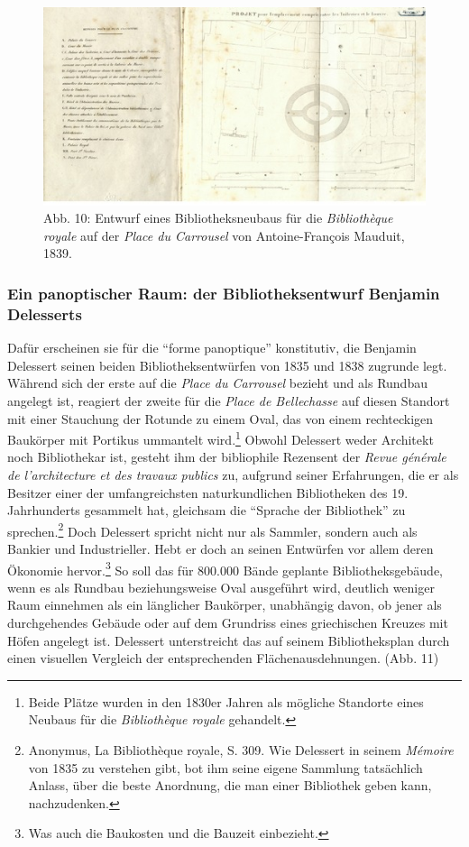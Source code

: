 \begin{figure}[htbp]
\centering
\includegraphics{img/wagner-10.jpg}
\caption{Abb. 10: Entwurf eines Bibliotheksneubaus für die
\emph{Bibliothèque royale} auf der \emph{Place du Carrousel} von
Antoine-François Mauduit, 1839.}
\end{figure}

\subsubsection{Ein panoptischer Raum: der Bibliotheksentwurf Benjamin
Delesserts}\label{ein-panoptischer-raum-der-bibliotheksentwurf-benjamin-delesserts}

Dafür erscheinen sie für die \enquote{forme panoptique} konstitutiv, die
Benjamin Delessert seinen beiden Bibliotheksentwürfen von 1835 und 1838
zugrunde legt. Während sich der erste auf die \emph{Place du Carrousel}
bezieht und als Rundbau angelegt ist, reagiert der zweite für die
\emph{Place de Bellechasse} auf diesen Standort mit einer Stauchung der
Rotunde zu einem Oval, das von einem rechteckigen Baukörper mit Portikus
ummantelt wird.\footnote{Beide Plätze wurden in den 1830er Jahren als
  mögliche Standorte eines Neubaus für die \emph{Bibliothèque royale}
  gehandelt.} Obwohl Delessert weder Architekt noch Bibliothekar ist,
gesteht ihm der bibliophile Rezensent der \emph{Revue générale de
l'architecture et des travaux publics} zu, aufgrund seiner Erfahrungen,
die er als Besitzer einer der umfangreichsten naturkundlichen
Bibliotheken des 19. Jahrhunderts gesammelt hat, gleichsam die
\enquote{Sprache der Bibliothek} zu sprechen.\footnote{Anonymus, La
  Bibliothèque royale, S. 309. Wie Delessert in seinem \emph{Mémoire}
  von 1835 zu verstehen gibt, bot ihm seine eigene Sammlung tatsächlich
  Anlass, über die beste Anordnung, die man einer Bibliothek geben kann,
  nachzudenken.} Doch Delessert spricht nicht nur als Sammler, sondern
auch als Bankier und Industrieller. Hebt er doch an seinen Entwürfen vor
allem deren Ökonomie hervor.\footnote{Was auch die Baukosten und die
  Bauzeit einbezieht.} So soll das für 800.000 Bände geplante
Bibliotheksgebäude, wenn es als Rundbau beziehungsweise Oval ausgeführt
wird, deutlich weniger Raum einnehmen als ein länglicher Baukörper,
unabhängig davon, ob jener als durchgehendes Gebäude oder auf dem
Grundriss eines griechischen Kreuzes mit Höfen angelegt ist. Delessert
unterstreicht das auf seinem Bibliotheksplan durch einen visuellen
Vergleich der entsprechenden Flächenausdehnungen. (Abb. 11)

